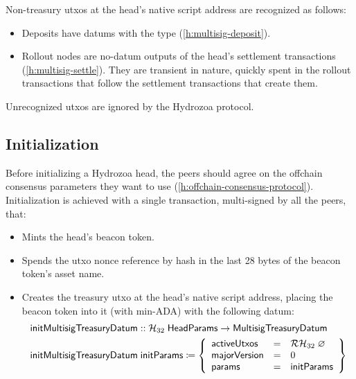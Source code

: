 \documentclass[../hydrozoa.tex]{subfiles}
\begin{document}
Non-treasury utxos at the head's native script address are recognized as follows:
\begin{itemize}
  \item Deposits have datums with the  type (\cref{h:multisig-deposit}).
  \item Rollout nodes are no-datum outputs of the head's settlement transactions (\cref{h:multisig-settle}).
    They are transient in nature, quickly spent in the rollout transactions that follow the settlement transactions that create them.
\end{itemize}

Unrecognized utxos are ignored by the Hydrozoa protocol.

\subsection{Initialization}%
\label{h:multisig-init}
Before initializing a Hydrozoa head, the peers should agree on the offchain consensus parameters they want to use (\cref{h:offchain-consensus-protocol}).
Initialization is achieved with a single transaction, multi-signed by all the peers, that:
\begin{itemize}
  \item Mints the head's beacon token.
  \item Spends the utxo nonce reference by hash in the last 28 bytes of the beacon token's asset name.
  \item Creates the treasury utxo at the head's native script address, placing the beacon token into it (with min-ADA) with the following datum:
    \begin{equation*}
    \begin{split}
      \mathsf{initMultisigTreasuryDatum} &:: \mathcal{H}_{32} \; \mathsf{HeadParams} -> \mathsf{MultisigTreasuryDatum} \\
      \mathsf{initMultisigTreasuryDatum} &\; \mathsf{initParams} \coloneq \left\{
        \begin{array}{lll}
          \mathsf{activeUtxos} &=& \mathcal{RH}_{32} \; \varnothing \\
          \mathsf{majorVersion} &=& 0 \\
          \mathsf{params} &=& \mathsf{initParams}
        \end{array}\right\}
    \end{split}
    \end{equation*}
\end{itemize}

\end{document}
